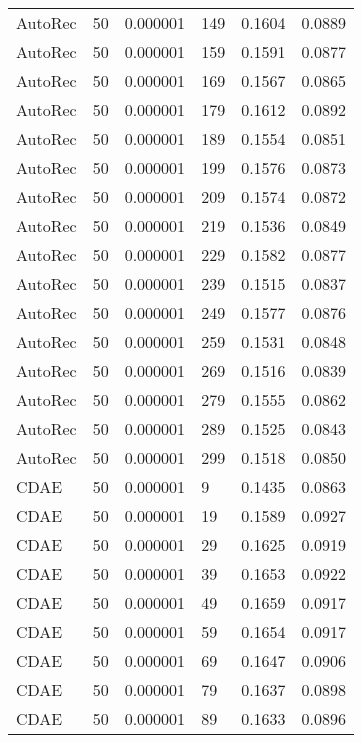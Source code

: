 \begin{tabular}{llrlrr}
 AutoRec &   50 &  0.000001 &   149 &  0.1604 &       0.0889 \\
 AutoRec &   50 &  0.000001 &   159 &  0.1591 &       0.0877 \\
 AutoRec &   50 &  0.000001 &   169 &  0.1567 &       0.0865 \\
 AutoRec &   50 &  0.000001 &   179 &  0.1612 &       0.0892 \\
 AutoRec &   50 &  0.000001 &   189 &  0.1554 &       0.0851 \\
 AutoRec &   50 &  0.000001 &   199 &  0.1576 &       0.0873 \\
 AutoRec &   50 &  0.000001 &   209 &  0.1574 &       0.0872 \\
 AutoRec &   50 &  0.000001 &   219 &  0.1536 &       0.0849 \\
 AutoRec &   50 &  0.000001 &   229 &  0.1582 &       0.0877 \\
 AutoRec &   50 &  0.000001 &   239 &  0.1515 &       0.0837 \\
 AutoRec &   50 &  0.000001 &   249 &  0.1577 &       0.0876 \\
 AutoRec &   50 &  0.000001 &   259 &  0.1531 &       0.0848 \\
 AutoRec &   50 &  0.000001 &   269 &  0.1516 &       0.0839 \\
 AutoRec &   50 &  0.000001 &   279 &  0.1555 &       0.0862 \\
 AutoRec &   50 &  0.000001 &   289 &  0.1525 &       0.0843 \\
 AutoRec &   50 &  0.000001 &   299 &  0.1518 &       0.0850 \\
    CDAE &   50 &  0.000001 &     9 &  0.1435 &       0.0863 \\
    CDAE &   50 &  0.000001 &    19 &  0.1589 &       0.0927 \\
    CDAE &   50 &  0.000001 &    29 &  0.1625 &       0.0919 \\
    CDAE &   50 &  0.000001 &    39 &  0.1653 &       0.0922 \\
    CDAE &   50 &  0.000001 &    49 &  0.1659 &       0.0917 \\
    CDAE &   50 &  0.000001 &    59 &  0.1654 &       0.0917 \\
    CDAE &   50 &  0.000001 &    69 &  0.1647 &       0.0906 \\
    CDAE &   50 &  0.000001 &    79 &  0.1637 &       0.0898 \\
    CDAE &   50 &  0.000001 &    89 &  0.1633 &       0.0896 \\

\end{tabular}
